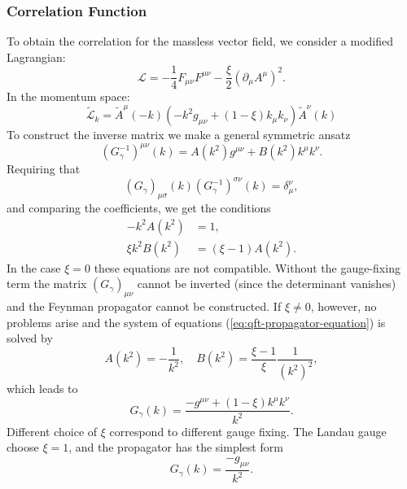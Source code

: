 \subsubsection{Correlation Function}
To obtain the correlation for the massless vector field, we consider a modified Lagrangian:
\begin{equation}
	\mathcal L = -\frac{1}{4}F_{\mu\nu}F^{\mu\nu}-\frac{\xi}{2}(\partial_\mu A^\mu)^2.
\end{equation}
In the momentum space:
\begin{equation}
	\tilde{\mathcal L}_k = \tilde{A}^\mu(-k)\left(-k^2 g_{\mu\nu}+(1-\xi)k_\mu k_\nu\right) \tilde{A}^\nu(k)
\end{equation}
To construct the inverse matrix we make a general symmetric ansatz
\begin{equation}
	(G_\gamma^{-1})^{\mu\nu}(k)=A\left(k^{2}\right) g^{\mu\nu}+B\left(k^{2}\right) k^{\mu} k^{\nu}.
\end{equation}
Requiring that
\begin{equation}
	(G_\gamma)_{\mu\sigma}(k)(G_\gamma^{-1})^{\sigma\nu}(k) = \delta_\mu^\nu,
\end{equation}
and comparing the coefficients, we get the conditions
\begin{equation}\label{eq:qft-propagator-equation}
\begin{aligned}
	-k^{2} A\left(k^{2}\right) &=1, \\
	\xi k^{2} B\left(k^{2}\right) &=(\xi-1) A\left(k^{2}\right).
\end{aligned}
\end{equation}
In the case $\xi=0$ these equations are not compatible. Without the gauge-fixing term the matrix $(G_\gamma)_{\mu \nu}$ cannot be inverted (since the determinant vanishes) and the Feynman propagator cannot be constructed. If $\xi \neq 0$, however, no problems arise and the system of equations (\ref{eq:qft-propagator-equation}) is solved by
\begin{equation}
	A\left(k^{2}\right)=-\frac{1}{k^{2}}, \quad B\left(k^{2}\right)=\frac{\xi-1}{\xi} \frac{1}{\left(k^{2}\right)^{2}},
\end{equation}
which leads to
\begin{equation}
	G_\gamma(k) = \frac{-g^{\mu\nu}+(1-\xi)k^\mu k^\nu}{k^2}.
\end{equation}
Different choice of $\xi$ correspond to different gauge fixing.
The Landau gauge choose $\xi=1$, and the propagator has the simplest form
\begin{equation}
	G_\gamma(k) = \frac{-g_{\mu\nu}}{k^2}.
\end{equation}


